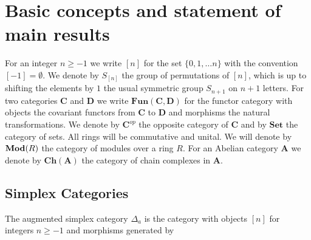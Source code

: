 \documentclass[12pt]{amsart}
\theoremstyle{plain}
\numberwithin{lemma}{\DefaultNumberTheoremWithin}
\numberwithin{claim}{\DefaultNumberTheoremWithin}
\numberwithin{theorem}{\DefaultNumberTheoremWithin}
\numberwithin{corollary}{\DefaultNumberTheoremWithin}
\numberwithin{proposition}{\DefaultNumberTheoremWithin}
\numberwithin{conjecture}{\DefaultNumberTheoremWithin}
\theoremstyle{definition}
\theoremstyle{definition}
\numberwithin{question}{\DefaultNumberTheoremWithin}
\theoremstyle{definition}
\numberwithin{problem}{\DefaultNumberTheoremWithin}
\theoremstyle{remark}
\numberwithin{remark}{\DefaultNumberTheoremWithin}
\theoremstyle{remark}
\numberwithin{example}{\DefaultNumberTheoremWithin}
\def\bA{\mathbf A}
\def\bC{\mathbf C}
\def\bD{\mathbf D}
\def\Fun{\mathbf{Fun}}
\def\Set{\mathbf{Set}}
\newcommand{\Ch}[1]{\mathbf{Ch}(#1)} %
\newcommand{\Sym}[1]{S_{[#1]}}
\newcommand{\firstappearence}[1]{{\sf #1}}
\begin{document}
\section{Basic concepts and statement of main results} \label{sec:basic} 

For an integer $n \geq -1$ we write $[n]$ for the set $\{0,1,\dots n\}$ with the convention $[-1]=\emptyset$.
We denote by $\Sym{n}$ the group of permutations of $[n]$, which 
is up to shifting the elements by $1$ the usual symmetric group $S_{n+1}$ on $n+1$ letters.
For two categories $\bC$ and $\bD$ we write 
$\Fun(\bC,\bD)$ for the functor category with objects the 
covariant functors from
$\bC$ to $\bD$ and morphisms the natural transformations. We denote by 
$\bC^{ op}$ the opposite category of $\bC$ and by $\Set$ the category of sets. All rings will be commutative and unital. We will denote by ${\bf Mod}(R)$ the category of modules over a ring $R$. For an Abelian category $\bA$ we denote by $\Ch{\bA}$ the category of chain complexes in $\bA$.

\subsection{Simplex Categories}\label{subsec:simpcat}

The \firstappearence{augmented simplex category} $\Delta_a$ is the category with objects $[n]$ for integers $n \geq -1$ and
morphisms generated by

\medskip
\end{document}
